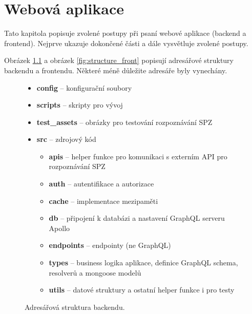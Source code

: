 \chapter{Webová aplikace}

\noindent
Tato kapitola popisuje zvolené postupy při psaní webové aplikace (backend a frontend).
Nejprve ukazuje dokončené části a dále vysvětluje zvolené postupy.

Obrázek \ref{fig:structure_back} a obrázek \ref{fig:structure_front} popisují adresářové
struktury backendu a frontendu.
Některé méně důležite adresáře byly vynechány.

\begin{figure} [!htb]
  \begin{itemize}
    \setlength\itemsep{.05em}
    \item \textbf{config} -- konfigurační soubory
    \item \textbf{scripts} -- skripty pro vývoj
    \item \textbf{test\_assets} -- obrázky pro testování rozpoznávání SPZ
    \item \textbf{src} -- zdrojový kód
    \begin{itemize}
      \setlength\itemsep{.05em}
      \item \textbf{apis} -- helper funkce pro komunikaci s externím API pro rozpoznávání SPZ
      \item \textbf{auth} -- autentifikace a autorizace
      \item \textbf{cache} -- implementace mezipaměti
      \item \textbf{db} -- připojení k databázi a nastavení GraphQL serveru Apollo
      \item \textbf{endpoints} -- endpointy (ne GraphQL)
      \item \textbf{types} -- business logika aplikace, definice GraphQL schema, resolverů a mongoose modelů
      \item \textbf{utils} -- datové struktury a ostatní helper funkce i pro testy
    \end{itemize}
  \end{itemize}
  \caption{Adresářová struktura backendu.}
  \label{fig:structure_back}
  \end{figure}
  
